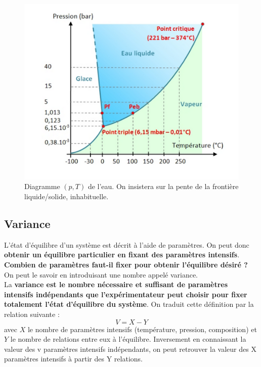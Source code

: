 \documentclass[11pt,a4paper]{report}
\begin{document}
\begin{figure}[h!]
	\begin{center}
  		\includegraphics[scale = 0.55]{pT_water.png}
		\caption{Diagramme $(p,T)$ de l'eau. On insistera sur la pente de la frontière 
		liquide/solide, inhabituelle.}
	\end{center}
\end{figure}

\subsection{Variance}

L'état d'équilibre d'un système est décrit à l'aide de paramètres. On peut donc \textbf{obtenir un équilibre particulier en fixant des paramètres intensifs}. \textbf{Combien de paramètres faut-il fixer pour obtenir l'équilibre désiré ?} On peut le savoir en introduisant une nombre appelé variance.\\

La \textbf{variance est le nombre nécessaire et suffisant de paramètres intensifs indépendants que l'expérimentateur peut choisir pour fixer totalement l'état d'équilibre du système}. On traduit cette définition par la relation suivante :
\begin{equation}
	\boxed{V = X - Y}
\end{equation}
avec $X$ le nombre de paramètres intensifs (température, pression, composition) et $Y$ le nombre de relations entre eux à l'équilibre. Inversement en connaissant la valeur des v paramètres intensifs indépendants, on peut retrouver la valeur des X paramètres intensifs à partir des Y relations.\\
\end{document}
